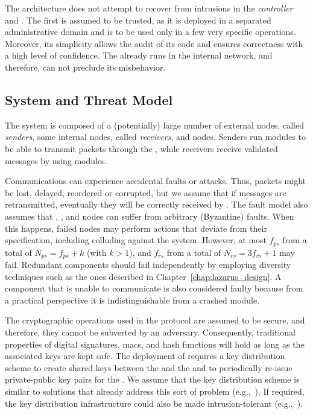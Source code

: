 The \sieveq architecture does not attempt to recover from intrusions in the \emph{controller} and \postsieve.
The first is assumed to be trusted, as it is deployed in a separated administrative domain and is to be used only in a few very specific operations.
Moreover, its simplicity allows the audit of its code and ensures correctness with a high level of confidence.
The \postsieve already runs in the internal network, and therefore, \sieveq can not preclude its misbehavior.



\subsection{System and Threat Model}
\label{fault_model}

The system is composed of a (potentially) large number of external nodes, called \emph{senders}, some internal nodes, called \emph{receivers}, and \sieveq nodes.
Senders run \sender modules to be able to transmit packets through the \sieveq, while receivers receive validated messages by using \postsieve modules. 

Communications can experience accidental faults or attacks.
Thus, packets might be lost, delayed, reordered or corrupted, but we assume that if messages are retransmitted, eventually they will be correctly received by \sieveq.
The fault model also assumes that \sender, \presieve, and \repsieve nodes can suffer from arbitrary (Byzantine) faults.
When this happens, failed nodes may perform actions that deviate from their specification, including colluding against the system.
However, at most $f_{ps}$ \presieves from a total of $N_{ps} = f_{ps} + k$ (with $k > 1$), and $f_{rs}$ \repsieve from a total of $N_{rs} = 3f_{rs}+1$ may fail.
Redundant components should fail independently by employing diversity techniques such as the ones described in Chapter~\ref{chap:lazarus_design}.
A component that is unable to communicate is also considered faulty because from a practical perspective it is indistinguishable from a crashed module.

The cryptographic operations used in the \sieveq protocol are assumed to be secure, and therefore, they cannot be subverted by an adversary. 
Consequently, traditional properties of digital signatures, \glspl{mac}, and hash functions will hold as long as the associated keys are kept safe.
The deployment of \sieveq requires a key distribution scheme to create shared keys between the \sender and the \presieve and to periodically re-issue private-public key pairs for the \sender.
We assume that the key distribution scheme is similar to solutions that already address this sort of problem (e.g.,~\cite{Harkins:1998}).
If required, the key distribution infrastructure could also be made intrusion-tolerant (e.g.,~\cite{Kreutz:2014,Zhou:2002}).


